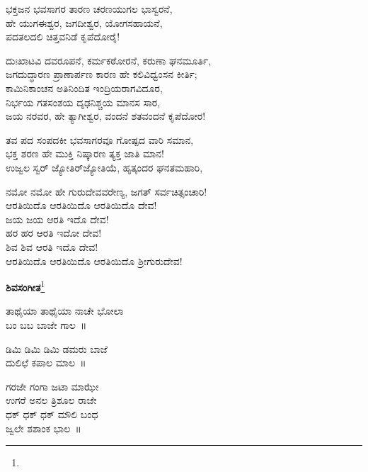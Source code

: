 \begin{myquote}
ಭಕ್ತಜನ ಭವಸಾಗರ ತಾರಣ ಚರಣಯುಗಲ ಭಾಸ್ವರನೆ,\\ಹೇ ಯುಗಈಶ್ವರ, ಜಗದೀಶ್ವರ, ಯೋಗಸಹಾಯನೆ,\\ಪದತಲದಲಿ ಚಿತ್ತವನಿಡೆ ಕೃಪೆದೋರೈ!
\end{myquote}

\begin{myquote}
ದುಃಖಾಟವಿ ದವರೂಪನೆ, ಕರ್ಮಕಠೋರನೆ, ಕರುಣಾ ಘನಮೂರ್ತಿ,\\ಜಗದುದ್ಧಾರಣ ಪ್ರಾಣಾರ್ಪಣ ಕಾರಣ ಹೇ ಕಲಿವಿಧ್ವಂಸನ ಕೀರ್ತಿ;\\ಕಾಮಿನಿಕಾಂಚನ ಅತಿನಿಂದಿತ ಇಂದ್ರಿಯರಾಗವಿದೂರ,\\ನಿರ್ಭಯ ಗತಸಂಶಯ ದೃಢನಿಶ್ಚಯ ಮಾನಸ ಸಾರ,\\ಜಯ ನರವರ, ಹೇ ತ್ಯಾಗೀಶ್ವರ, ವಂದನೆ ಶತವಂದನೆ ಕೃಪೆದೋರ!
\end{myquote}

\begin{myquote}
ತವ ಪದ ಸಂಪದಕೀ ಭವಸಾಗರವೂ ಗೋಷ್ಪದ ವಾರಿ ಸಮಾನ,\\ಭಕ್ತ ಶರಣ ಹೇ ಮುಕ್ತಿ ನಿಷ್ಕಾರಣ ತ್ಯಕ್ತ ಜಾತಿ ಮಾನ!\\ಉಜ್ವಲ ಸ್ವರ್ ಜ್ಯೋತಿರ್‌ಜ್ಯೋತಿಯೆ, ಹೃತ್ಕಂದರ ಘನತಮಹಾರಿ,
\end{myquote}

\begin{myquote}
ನಮೋ ನಮೋ ಹೇ ಗುರುದೇವವರೇಣ್ಯ, ಜಗತ್ ಸರ್ವಚಿತ್ಸಂಚಾರಿ!\\ಆರತಿಯಿದೊ ಆರತಿಯಿದೊ ಆರತಿಯಿದೊ ದೇವ!\\ಜಯ ಜಯ ಆರತಿ ಇದೊ ದೇವ!\\ಹರ ಹರ ಆರತಿ ಇದೋ ದೇವ!\\ಶಿವ ಶಿವ ಆರತಿ ಇದೊ ದೇವ!\\ಆರತಿಯಿದೊ ಆರತಿಯಿದೊ ಆರತಿಯಿದೊ ಶ‍್ರೀಗುರುದೇವ!
\end{myquote}

\begin{center}
\textbf{ಶಿವಸಂಗೀತ}\footnote{}
\end{center}

\begin{myquote}
ತಾಥೈಯಾ ತಾಥೈಯಾ ನಾಚೇ ಭೋಲಾ\\ಬಂ ಬಬ ಬಾಜೇ ಗಾಲ~॥
\end{myquote}

\begin{myquote}
ಡಿಮಿ ಡಿಮಿ ಡಿಮಿ ಡಮರು ಬಾಜೆ\\ದುಲಿಛೆ ಕಪಾಲ ಮಾಲ~॥
\end{myquote}

\begin{myquote}
ಗರಜೇ ಗಂಗಾ ಜಟಾ ಮಾಝೇ\\ಉಗರೆ ಅನಲ ತ್ರಿಶೂಲ ರಾಜೇ\\ಧಕ್ ಧಕ್ ಧಕ್ ಮೌಲಿ ಬಂಧ\\ಜ್ವಲೇ ಶಶಾಂಕ ಭಾಲ~॥
\end{myquote}

